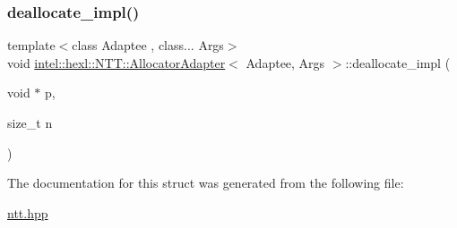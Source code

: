 \mbox{\label{structintel_1_1hexl_1_1NTT_1_1AllocatorAdapter_a123aa02665ce9f2b219ca9b88164e114}} 
\subsubsection{\texorpdfstring{deallocate\+\_\+impl()}{deallocate\_impl()}}
{\footnotesize\ttfamily template$<$class Adaptee , class... Args$>$ \\
void \hyperlink{structintel_1_1hexl_1_1NTT_1_1AllocatorAdapter}{intel\+::hexl\+::\+N\+T\+T\+::\+Allocator\+Adapter}$<$ Adaptee, Args $>$\+::deallocate\+\_\+impl (\begin{DoxyParamCaption}\item[{void $\ast$}]{p,  }\item[{size\+\_\+t}]{n }\end{DoxyParamCaption})}



The documentation for this struct was generated from the following file\+:\begin{DoxyCompactItemize}
\item 
\hyperlink{ntt_8hpp}{ntt.\+hpp}\end{DoxyCompactItemize}
